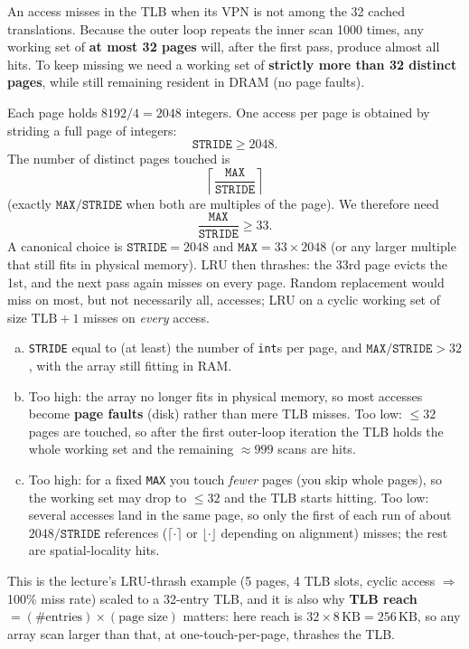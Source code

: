 \documentclass[11pt,a4paper]{article}
\newenvironment{Sol}{%
  \begin{tcolorbox}[sboxstyle, title={Solution}]%
}{%
  \end{tcolorbox}\vspace{0.35em}%
}
\begin{document}
\begin{Sol}
An access misses in the TLB when its VPN is not among the 32 cached
translations. Because the outer loop repeats the inner scan 1000 times,
any working set of \textbf{at most 32 pages} will, after the first pass,
produce almost all hits. To keep missing we need a working set of
\textbf{strictly more than 32 distinct pages}, while still remaining
resident in DRAM (no page faults).

Each page holds $8192/4 = 2048$ integers. One access per page is obtained
by striding a full page of integers:
\[
\texttt{STRIDE} \ge 2048.
\]
The number of distinct pages touched is
\[
\left\lceil\frac{\texttt{MAX}}{\texttt{STRIDE}}\right\rceil
\]
(exactly $\texttt{MAX}/\texttt{STRIDE}$ when both are multiples of the
page). We therefore need
\[
\frac{\texttt{MAX}}{\texttt{STRIDE}} \ge 33.
\]
A canonical choice is $\texttt{STRIDE}=2048$ and $\texttt{MAX}=33\times 2048$
(or any larger multiple that still fits in physical memory). LRU then
thrashes: the 33rd page evicts the 1st, and the next pass again misses on
every page. Random replacement would miss on most, but not necessarily
all, accesses; LRU on a cyclic working set of size $\mathrm{TLB}+1$ misses
on \emph{every} access.

\begin{enumerate}[(a)]
\item \texttt{STRIDE} equal to (at least) the number of \texttt{int}s per
      page, and $\texttt{MAX}/\texttt{STRIDE} > 32$, with the array still
      fitting in RAM.
\item Too high: the array no longer fits in physical memory, so most
      accesses become \textbf{page faults} (disk) rather than mere TLB
      misses. Too low: $\le 32$ pages are touched, so after the first
      outer-loop iteration the TLB holds the whole working set and the
      remaining $\approx 999$ scans are hits.
\item Too high: for a fixed \texttt{MAX} you touch \emph{fewer} pages
      (you skip whole pages), so the working set may drop to $\le 32$ and
      the TLB starts hitting. Too low: several accesses land in the same
      page, so only the first of each run of about
      $2048/\texttt{STRIDE}$ references ($\lceil\cdot\rceil$ or
      $\lfloor\cdot\rfloor$ depending on alignment) misses;
      the rest are spatial-locality hits.
\end{enumerate}
This is the lecture's LRU-thrash example (5 pages, 4 TLB slots, cyclic
access $\Rightarrow$ 100\% miss rate) scaled to a 32-entry TLB, and it is
also why \textbf{TLB reach} $=(\#\textrm{entries})\times(\textrm{page size})$
matters: here reach is $32\times 8\,\mathrm{KB}=256\,\mathrm{KB}$, so any
array scan larger than that, at one-touch-per-page, thrashes the TLB.
\end{Sol}
\end{document}
